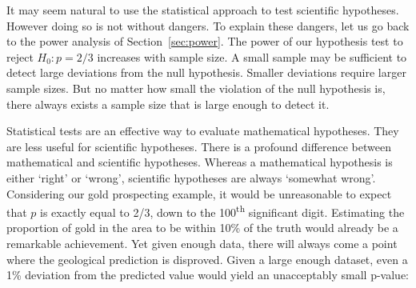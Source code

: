 It may seem natural to use the statistical approach to test scientific
hypotheses. However doing so is not without dangers. To explain these
dangers, let us go back to the power analysis of
Section~\ref{sec:power}. The power of our hypothesis test to reject
$H_0: p=2/3$ increases with sample size. A small sample may be
sufficient to detect large deviations from the null
hypothesis. Smaller deviations require larger sample sizes. But no
matter how small the violation of the null hypothesis is, there always
exists a sample size that is large enough to detect it.\medskip

Statistical tests are an effective way to evaluate mathematical
hypotheses. They are less useful for scientific hypotheses.  There is
a profound difference between mathematical and scientific
hypotheses. Whereas a mathematical hypothesis is either `right' or
`wrong', scientific hypotheses are always `somewhat wrong'.
Considering our gold prospecting example, it would be unreasonable to
expect that $p$ is exactly equal to 2/3, down to the
100\textsuperscript{th} significant digit.  Estimating the proportion
of gold in the area to be within 10\% of the truth would already be a
remarkable achievement. Yet given enough data, there will always come
a point where the geological prediction is disproved. Given a large
enough dataset, even a 1\% deviation from the predicted value would
yield an unacceptably small p-value:

